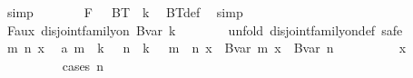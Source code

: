 \begin{isabellebody}
\ simp\isanewline
\ \ \ \ \isamarkupfalse%
\ \isamarkupfalse%
\ F{}{\isacharcolon}{\kern0pt}\ {\isachardoublequoteopen}{\isacharbraceleft}{\kern0pt}{\isacharbraceright}{\kern0pt}\ {\isasymnotin}\ BT\ {\isacharbackquote}{\kern0pt}\ {\isacharbraceleft}{\kern0pt}{\isachardot}{\kern0pt}{\isachardot}{\kern0pt}{\isacharless}{\kern0pt}k{\isacharplus}{\kern0pt}{}{\isacharbraceright}{\kern0pt}{\isachardoublequoteclose}\ \isamarkupfalse%
\ BT{\isacharunderscore}{\kern0pt}def\ \isamarkupfalse%
\ simp\isanewline
\ \ \ \ \isamarkupfalse%
\isanewline
\ \ \ \ \isacommand{{\isacharbraceleft}{\kern0pt}}\isamarkupfalse%
\isanewline
\ \ \ \ \ \ \isamarkupfalse%
\ F{}{\isacharunderscore}{\kern0pt}aux{\isacharcolon}{\kern0pt}\ {\isachardoublequoteopen}disjoint{\isacharunderscore}{\kern0pt}family{\isacharunderscore}{\kern0pt}on\ Bvar\ {\isacharbraceleft}{\kern0pt}{\isachardot}{\kern0pt}{\isachardot}{\kern0pt}{\isacharless}{\kern0pt}k{\isacharplus}{\kern0pt}{}{\isacharbraceright}{\kern0pt}{\isachardoublequoteclose}\isanewline
\ \ \ \ \ \ \isamarkupfalse%
\ {\isacharparenleft}{\kern0pt}unfold\ disjoint{\isacharunderscore}{\kern0pt}family{\isacharunderscore}{\kern0pt}on{\isacharunderscore}{\kern0pt}def{\isacharsemicolon}{\kern0pt}\ safe{\isacharparenright}{\kern0pt}\isanewline
\ \ \ \ \ \ \ \ \isamarkupfalse%
\ m\ n\ x\ \isamarkupfalse%
\ a{\isacharcolon}{\kern0pt}\ {\isachardoublequoteopen}m\ {\isacharless}{\kern0pt}\ k\ {\isacharplus}{\kern0pt}\ {}{\isachardoublequoteclose}\ {\isachardoublequoteopen}n\ {\isacharless}{\kern0pt}\ k\ {\isacharplus}{\kern0pt}\ {}{\isachardoublequoteclose}\ {\isachardoublequoteopen}m\ {\isasymnoteq}\ n{\isachardoublequoteclose}\ {\isachardoublequoteopen}x\ {\isasymin}\ Bvar\ m{\isachardoublequoteclose}\ {\isachardoublequoteopen}x\ {\isasymin}\ Bvar\ n{\isachardoublequoteclose}\isanewline
\ \ \ \ \ \ \ \ \isamarkupfalse%
\ {\isachardoublequoteopen}x\ {\isasymin}\ {\isacharbraceleft}{\kern0pt}{\isacharbraceright}{\kern0pt}{\isachardoublequoteclose}\isanewline
\ \ \ \ \ \ \ \ \isamarkupfalse%
\ {\isacharparenleft}{\kern0pt}cases\ {\isachardoublequoteopen}n{\isachardoublequoteclose}{\isacharparenright}{\kern0pt}\isanewline
\ \ \ \ \ \ \ \ \ \ \isamarkupfalse%
\ {}\isanewline
\ \ \ \ \ \ \ \ \ \ \isamarkupfalse%
\ \isamarkupfalse%

\end{isabellebody}
